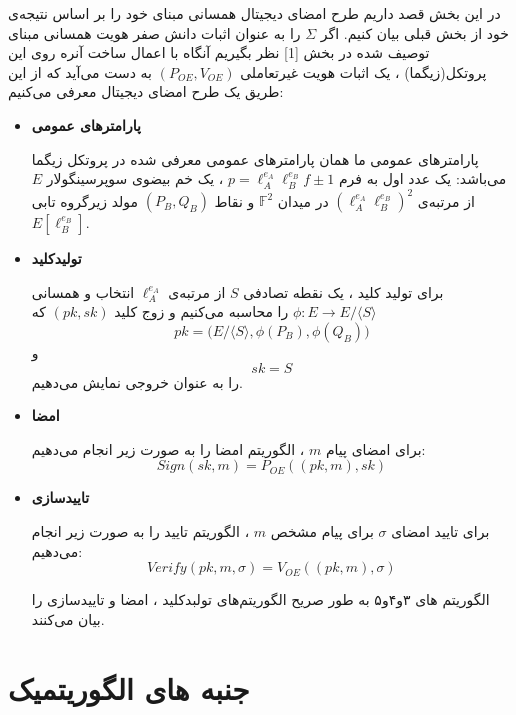 \documentclass[12pt,a4paper]{article}
\begin{document}
در این بخش قصد داریم طرح امضای دیجیتال همسانی مبنای خود را بر اساس نتیجه‌ی خود از بخش قبلی بیان کنیم. اگر 
$\Sigma$
را به عنوان اثبات دانش صفر هویت همسانی مبنای توصیف شده در بخش 
[1]
نظر بگیریم آنگاه با اعمال ساخت آنره روی این پروتکل(زیگما) ، یک اثبات هویت غیرتعاملی 
$(P_{OE},V_{OE})$
به دست می‌آید که از این طریق یک طرح امضای دیجیتال معرفی می‌کنیم: 
\begin{itemize}
	\item[]{\bf پارامترهای عمومی }
	
	پارامترهای عمومی ما همان پارامترهای عمومی معرفی شده در پروتکل زیگما می‌باشد: یک عدد اول به فرم 
	$p = \ell_A^{e_A} \ell_B^{e_B} f \pm 1$
	، یک خم بیضوی سوپرسینگولار 
	$E$
	از مرتبه‌ی
	$(\ell_A^{e_A} \ell_B^{e_B})^2$
	در میدان 
	$\mathbb{F}^2$
	و نقاط 
	$(P_B,Q_B)$
	مولد زیرگروه تابی 
	$E[\ell_B^{e_B} ]$.
	
	\item[]{\bf تولیدکلید}
	
	برای تولید کلید ، یک نقطه تصادفی
$S$
از مرتبه‌ی
$\ell_A^{e_A}$	
انتخاب و همسانی
\newline
$\phi : E \rightarrow E/ \langle S \rangle $
را محاسبه می‌کنیم و زوج کلید 
$(pk,sk)$
که  
$$pk = \Big(E/ \langle S \rangle , \phi (P_B) , \phi (Q_B) \Big)$$
و
$$ sk = S $$	
را به عنوان خروجی نمایش می‌دهیم.
\newline
\item[]{\bf امضا}

برای امضای پیام 
$m$
، الگوریتم امضا را به صورت زیر انجام می‌دهیم: 
$$ Sign(sk,m) = P_{OE}((pk,m),sk)$$

\item[]{\bf تاییدسازی}

برای تایید امضای
$\sigma$
برای پیام مشخص
$m$
، الگوریتم تایید را به صورت زیر انجام می‌دهیم:
$$ Verify(pk,m,\sigma) = V_{OE}((pk,m),\sigma) $$

الگوریتم های ۳و۴و۵ به طور صریح الگوریتم‌های تولبدکلید ، امضا و تاییدسازی را بیان می‌کنند.

\end{itemize}


\section{\bf جنبه های الگوریتمیک}\label{algorithm_aspect}
\end{document}
